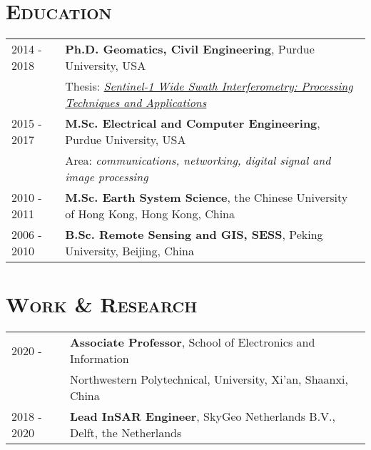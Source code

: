 \documentclass[letterpaper]{article}
\begin{document}
\section*{\textsc{Education}}
\begin{tabular}{ll}
2014 - 2018 & \textbf{Ph.D. Geomatics, Civil Engineering}, Purdue University, USA\\
		& Thesis: \href{https://doi.org/10.25394/PGS.7543214.v1}{\textit{Sentinel-1 Wide Swath Interferometry: Processing Techniques and Applications}} \vspace{.5em}\\
2015 - 2017 & \textbf{M.Sc. Electrical and Computer Engineering}, Purdue University, USA\\
		& Area: \textit{communications, networking, digital signal and image processing} \vspace{.5em}\\

2010 - 2011 & \textbf{M.Sc. Earth System Science}, the Chinese University of Hong Kong, Hong Kong, China \vspace{.5em}\\
        
2006 - 2010 & \textbf{B.Sc. Remote Sensing and GIS, SESS}, Peking University, Beijing, China\\
\end{tabular}


\section*{\textsc{Work \& Research}}
\begin{tabular}{ll}
2020 -      & \textbf{Associate Professor}, School of Electronics and Information \\ & Northwestern Polytechnical, University, Xi'an, Shaanxi, China  \vspace{.5em}\\
2018 - 2020 & \textbf{Lead InSAR Engineer}, SkyGeo Netherlands B.V.,  Delft, the Netherlands \\
\end{tabular}

\end{document}
